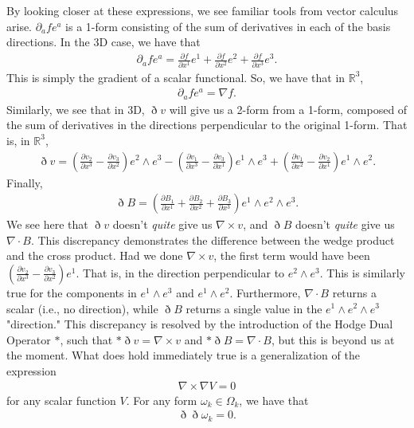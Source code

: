 \documentclass{book}
\begin{document}
By looking closer at these expressions, we see familiar tools from vector calculus arise. $\partial_a f e^a$ is a 1-form consisting of the sum of derivatives in each of the basis directions. In the 3D case, we have that \begin{gather}\partial_a f e^a = \frac{\partial f}{\partial x^1} e^1 + \frac{\partial f}{\partial x^2} e^2 + \frac{\partial f}{\partial x^3} e^3.\end{gather} This is simply the gradient of a scalar functional. So, we have that in $\mathbb{R}^3$, \begin{gather}\partial_a f e^a = \nabla f.\end{gather} Similarly, we see that in 3D, $\eth v$ will give us a 2-form from a 1-form, composed of the sum of derivatives in the directions perpendicular to the original 1-form. That is, in $\mathbb{R}^3$, \begin{gather}\eth v = (\frac{\partial v_2}{\partial x^3} - \frac{\partial v_3}{\partial x^2})e^2\wedge e^3 - (\frac{\partial v_1}{\partial x^3} - \frac{\partial v_3}{\partial x^1})e^1 \wedge e^3 + (\frac{\partial v_1}{\partial x^2} - \frac{\partial v_2}{\partial x^1})e^1 \wedge e^2.\end{gather} Finally, \begin{gather} \eth B = (\frac{\partial B_1}{\partial x^1} + \frac{\partial B_2}{\partial x^2} + \frac{\partial B_3}{\partial x^3})e^1\wedge e^2 \wedge e^3.\end{gather} We see here that $\eth v$ doesn't \emph{quite} give us $\nabla \times v$, and $\eth B$ doesn't \emph{quite} give us $\nabla \cdot B$. This discrepancy demonstrates the difference between the wedge product and the cross product. Had we done $\nabla \times v$, the first term would have been $(\frac{\partial v_2}{\partial x^3} - \frac{\partial v_3}{\partial x^2})e^1$. That is, in the direction perpendicular to $e^2\wedge e^3$. This is similarly true for the components in $e^1\wedge e^3$ and $e^1 \wedge e^2$. Furthermore, $\nabla \cdot B$ returns a scalar (i.e., no direction), while $\eth B$ returns a single value in the $e^1 \wedge e^2 \wedge e^3$ "direction." This discrepancy is resolved by the introduction of the Hodge Dual Operator $*$, such that $*\eth v = \nabla \times v$ and $*\eth B = \nabla \cdot B$, but this is beyond us at the moment. What does hold immediately true is a generalization of the expression \begin{gather} \nabla \times \nabla V = 0\end{gather} for any scalar function $V$. For any form $\omega_k \in \Omega_k$, we have that \begin{gather} \eth\eth\omega_k = 0.\end{gather}
\end{document}
